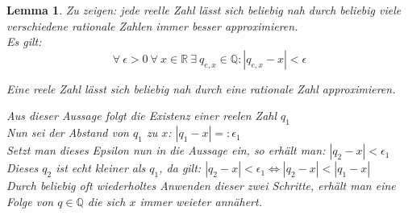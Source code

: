 \documentclass[11pt]{article}
\begin{document}
    \newtheorem{lemma4}[lemma_counter]{Lemma}
    \begin{lemma4}
        Zu zeigen: jede reelle Zahl lässt sich beliebig nah durch beliebig viele verschiedene rationale Zahlen immer besser approximieren. \\
        Es gilt: 
        \[\forall \: \epsilon > 0 \: \forall \: x \in \mathbb{R} \: \exists \: q_{e,x} \in \mathbb{Q}: |q_{e,x} - x| < \epsilon \]
        \begin{center}
            Eine reele Zahl lässt sich beliebig nah durch eine rationale Zahl approximieren.
        \end{center}
        Aus dieser Aussage folgt die Existenz einer reelen Zahl \(q_1\) \\
        Nun sei der Abstand von \(q_1\) zu \(x\): \( |q_1 - x| =: \epsilon_1 \) \\
        Setzt man dieses Epsilon nun in die Aussage ein, so erhält man: \( |q_2 - x| < \epsilon_1 \) \\
        Dieses \(q_2\) ist echt kleiner als \(q_1\), da gilt:
        \( |q_2 - x| < \epsilon_1 \Leftrightarrow |q_2 - x| < |q_1 - x| \) \\
        Durch beliebig oft wiederholtes Anwenden dieser zwei Schritte, erhält man eine Folge von \(q \in \mathbb{Q} \) die sich \(x\) immer weieter annähert. 
    \end{lemma4}
\end{document}
